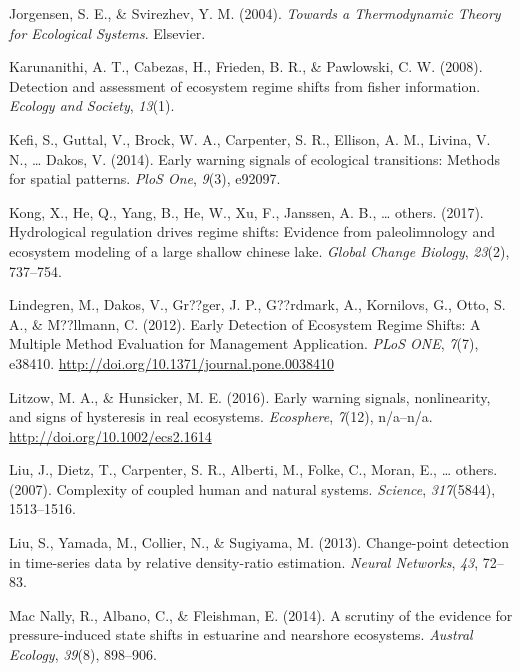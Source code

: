 \documentclass[12pt,twoside,openany]{reedthesis}
\begin{document}
\leavevmode\hypertarget{ref-jorgensen_towards_2004}{}%
Jorgensen, S. E., \& Svirezhev, Y. M. (2004). \emph{Towards a Thermodynamic Theory for Ecological Systems}. Elsevier.

\leavevmode\hypertarget{ref-karunanithi_detection_2008}{}%
Karunanithi, A. T., Cabezas, H., Frieden, B. R., \& Pawlowski, C. W. (2008). Detection and assessment of ecosystem regime shifts from fisher information. \emph{Ecology and Society}, \emph{13}(1).

\leavevmode\hypertarget{ref-kefi2014early}{}%
Kefi, S., Guttal, V., Brock, W. A., Carpenter, S. R., Ellison, A. M., Livina, V. N., \ldots{} Dakos, V. (2014). Early warning signals of ecological transitions: Methods for spatial patterns. \emph{PloS One}, \emph{9}(3), e92097.

\leavevmode\hypertarget{ref-kong2017hydrological}{}%
Kong, X., He, Q., Yang, B., He, W., Xu, F., Janssen, A. B., \ldots{} others. (2017). Hydrological regulation drives regime shifts: Evidence from paleolimnology and ecosystem modeling of a large shallow chinese lake. \emph{Global Change Biology}, \emph{23}(2), 737--754.

\leavevmode\hypertarget{ref-lindegren_early_2012}{}%
Lindegren, M., Dakos, V., Gr??ger, J. P., G??rdmark, A., Kornilovs, G., Otto, S. A., \& M??llmann, C. (2012). Early Detection of Ecosystem Regime Shifts: A Multiple Method Evaluation for Management Application. \emph{PLoS ONE}, \emph{7}(7), e38410. \url{http://doi.org/10.1371/journal.pone.0038410}

\leavevmode\hypertarget{ref-litzow_early_2016}{}%
Litzow, M. A., \& Hunsicker, M. E. (2016). Early warning signals, nonlinearity, and signs of hysteresis in real ecosystems. \emph{Ecosphere}, \emph{7}(12), n/a--n/a. \url{http://doi.org/10.1002/ecs2.1614}

\leavevmode\hypertarget{ref-liu_complexity_2007}{}%
Liu, J., Dietz, T., Carpenter, S. R., Alberti, M., Folke, C., Moran, E., \ldots{} others. (2007). Complexity of coupled human and natural systems. \emph{Science}, \emph{317}(5844), 1513--1516.

\leavevmode\hypertarget{ref-liu2013change}{}%
Liu, S., Yamada, M., Collier, N., \& Sugiyama, M. (2013). Change-point detection in time-series data by relative density-ratio estimation. \emph{Neural Networks}, \emph{43}, 72--83.

\leavevmode\hypertarget{ref-mac2014scrutiny}{}%
Mac Nally, R., Albano, C., \& Fleishman, E. (2014). A scrutiny of the evidence for pressure-induced state shifts in estuarine and nearshore ecosystems. \emph{Austral Ecology}, \emph{39}(8), 898--906.
\end{document}
